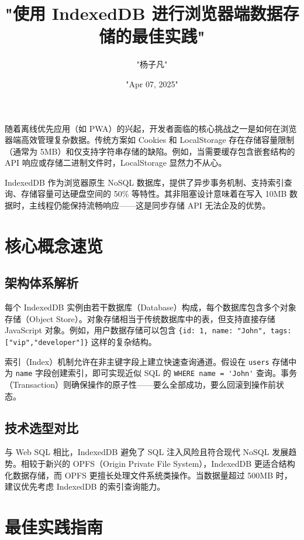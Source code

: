 \title{"使用 IndexedDB 进行浏览器端数据存储的最佳实践"}
\author{"杨子凡"}
\date{"Apr 07, 2025"}
\maketitle
随着离线优先应用（如 PWA）的兴起，开发者面临的核心挑战之一是如何在浏览器端高效管理复杂数据。传统方案如 Cookies 和 LocalStorage 存在存储容量限制（通常为 5MB）和仅支持字符串存储的缺陷。例如，当需要缓存包含嵌套结构的 API 响应或存储二进制文件时，LocalStorage 显然力不从心。\par
IndexedDB 作为浏览器原生 NoSQL 数据库，提供了异步事务机制、支持索引查询、存储容量可达硬盘空间的 50\%{} 等特性。其非阻塞设计意味着在写入 10MB 数据时，主线程仍能保持流畅响应——这是同步存储 API 无法企及的优势。\par
\chapter{核心概念速览}
\section{架构体系解析}
每个 IndexedDB 实例由若干数据库（Database）构成，每个数据库包含多个对象存储（Object Store）。对象存储相当于传统数据库中的表，但支持直接存储 JavaScript 对象。例如，用户数据存储可以包含 \verb!{id: 1, name: "John", tags: ["vip","developer"]}! 这样的复杂结构。\par
索引（Index）机制允许在非主键字段上建立快速查询通道。假设在 \verb!users! 存储中为 \verb!name! 字段创建索引，即可实现近似 SQL 的 \verb!WHERE name = 'John'! 查询。事务（Transaction）则确保操作的原子性——要么全部成功，要么回滚到操作前状态。\par
\section{技术选型对比}
与 Web SQL 相比，IndexedDB 避免了 SQL 注入风险且符合现代 NoSQL 发展趋势。相较于新兴的 OPFS（Origin Private File System），IndexedDB 更适合结构化数据存储，而 OPFS 更擅长处理文件系统类操作。当数据量超过 500MB 时，建议优先考虑 IndexedDB 的索引查询能力。\par
\chapter{最佳实践指南}
